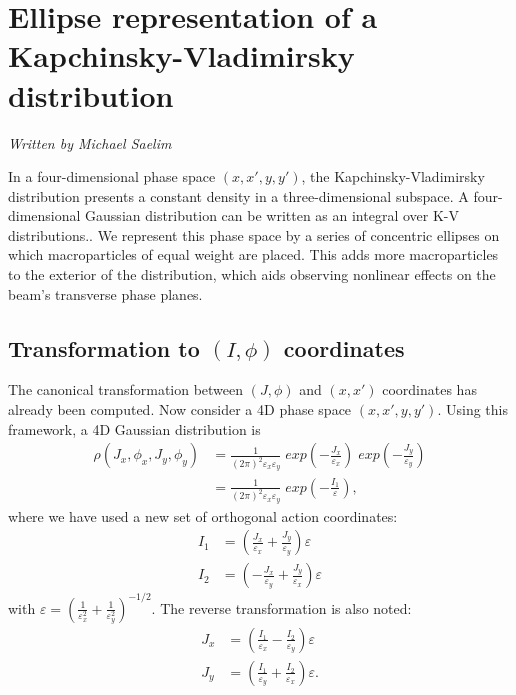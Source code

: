 \section{Ellipse representation of a Kapchinsky-Vladimirsky distribution}

\textit{Written by Michael Saelim}

In a four-dimensional phase space $(x,x',y,y')$, the Kapchinsky-Vladimirsky distribution presents a constant density in a three-dimensional subspace.  A four-dimensional Gaussian distribution can be written as an integral over K-V distributions..  We represent this phase space by a series of concentric ellipses on which macroparticles of equal weight are placed.  This adds more macroparticles to the exterior of the distribution, which aids observing nonlinear effects on the beam's transverse phase planes.

\subsection{Transformation to $(I,\phi)$ coordinates}
The canonical transformation between $(J,\phi)$ and $(x,x')$ coordinates has already been computed.  Now consider a 4D phase space $(x,x',y,y')$.  Using this framework, a 4D Gaussian distribution is
\begin{align}
	\rho(J_x,\phi_x,J_y,\phi_y) & = \frac{1}{(2\pi)^2 \varepsilon_x \varepsilon_y}\; exp(-\frac{J_x}{\varepsilon_x})\; exp(-\frac{J_y}{\varepsilon_y}) \\
	                            & = \frac{1}{(2\pi)^2 \varepsilon_x \varepsilon_y}\; exp(-\frac{I_1}{\varepsilon}),
\end{align}
where we have used a new set of orthogonal action coordinates:
\begin{align}
	I_1 & = \left( \frac{J_x}{\varepsilon_x} + \frac{J_y}{\varepsilon_y} \right) \varepsilon  \\
	I_2 & = \left( -\frac{J_x}{\varepsilon_y} + \frac{J_y}{\varepsilon_x} \right) \varepsilon
\end{align}
with $\varepsilon = (\frac{1}{\varepsilon_x^2} + \frac{1}{\varepsilon_y^2})^{-1/2}$.  The reverse transformation is also noted:
\begin{align}
	J_x & = \left( \frac{I_1}{\varepsilon_x} - \frac{I_2}{\varepsilon_y} \right) \varepsilon  \\
	J_y & = \left( \frac{I_1}{\varepsilon_y} + \frac{I_2}{\varepsilon_x} \right) \varepsilon.
\end{align}


